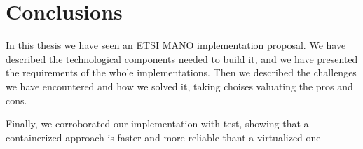 \chapter{Conclusions}
\label{chap:conclusions}

In this thesis we have seen an ETSI MANO implementation proposal. We have 
described the technological components needed to build it, and we have 
presented the requirements of the whole implementations. Then we described 
the challenges we have encountered and how we solved it, taking choises 
valuating the pros and cons.

Finally, we corroborated our implementation with test, showing that a 
containerized approach is faster and more reliable thant a virtualized one
